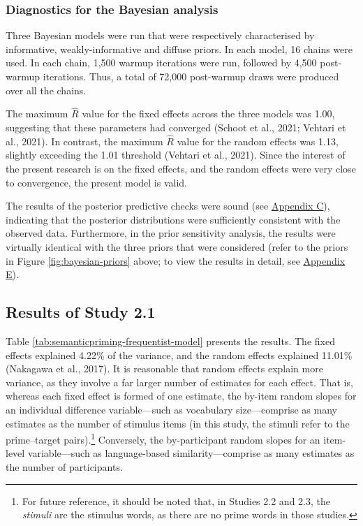 \documentclass[
  12pt,
  man,floatsintext]{apa7}
\begin{document}
\hypertarget{diagnostics-for-the-bayesian-analysis}{%
\subsubsection{Diagnostics for the Bayesian analysis}\label{diagnostics-for-the-bayesian-analysis}}

Three Bayesian models were run that were respectively characterised by informative, weakly-informative and diffuse priors. In each model, 16 chains were used. In each chain, 1,500 warmup iterations were run, followed by 4,500 post-warmup iterations. Thus, a total of 72,000 post-warmup draws were produced over all the chains.

The maximum \(\widehat R\) value for the fixed effects across the three models was 1.00, suggesting that these parameters had converged (Schoot et al., 2021; Vehtari et al., 2021). In contrast, the maximum \(\widehat R\) value for the random effects was 1.13, slightly exceeding the 1.01 threshold (Vehtari et al., 2021). Since the interest of the present research is on the fixed effects, and the random effects were very close to convergence, the present model is valid.

The results of the posterior predictive checks were sound (see \protect\hyperlink{appendix-C-Bayesian-analysis-diagnostics}{\underline{Appendix C}}), indicating that the posterior distributions were sufficiently consistent with the observed data. Furthermore, in the prior sensitivity analysis, the results were virtually identical with the three priors that were considered (refer to the priors in Figure \ref{fig:bayesian-priors} above; to view the results in detail, see \protect\hyperlink{appendix-E-Bayesian-analysis-results}{\underline{Appendix E}}).

\hypertarget{semanticpriming-results}{%
\subsection{Results of Study 2.1}\label{semanticpriming-results}}

Table \ref{tab:semanticpriming-frequentist-model} presents the results. The fixed effects explained 4.22\% of the variance, and the random effects explained 11.01\% (Nakagawa et al., 2017). It is reasonable that random effects explain more variance, as they involve a far larger number of estimates for each effect. That is, whereas each fixed effect is formed of one estimate, the by-item random slopes for an individual difference variable---such as vocabulary size---comprise as many estimates as the number of stimulus items (in this study, the stimuli refer to the prime--target pairs).\footnote{For future reference, it should be noted that, in Studies 2.2 and 2.3, the \emph{stimuli} are the stimulus words, as there are no prime words in those studies.} Conversely, the by-participant random slopes for an item-level variable---such as language-based similarity---comprise as many estimates as the number of participants.
\end{document}
